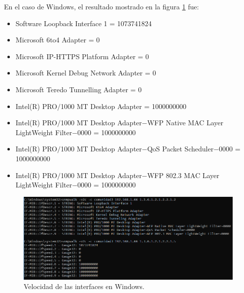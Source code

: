 En el caso de Windows, el resultado mostrado en la figura \ref{image:velocidadInterfacesw} fue:
\begin{itemize}
\item Software Loopback Interface 1 = 1073741824
\item Microsoft 6to4 Adapter = 0
\item Microsoft IP-HTTPS Platform Adapter = 0
\item Microsoft Kernel Debug Network Adapter = 0
\item Microsoft Teredo Tunnelling Adapter = 0
\item Intel(R) PRO$/$1000 MT Desktop Adapter = 1000000000
\item Intel(R) PRO$/$1000 MT Desktop Adapter$-$WFP Native MAC Layer LightWeight Filter$-$0000 = 1000000000
\item Intel(R) PRO$/$1000 MT Desktop Adapter$-$QoS Packet Scheduler$-$0000 = 1000000000
\item Intel(R) PRO$/$1000 MT Desktop Adapter$-$WFP 802.3 MAC Layer LightWeight Filter$-$0000 = 1000000000
\end{itemize}
\FloatBarrier
\begin{figure}[htbp!]
		\centering
			\includegraphics[width=.95 \textwidth]{images/windows3}
		\caption{Velocidad de las interfaces en Windows.}
		\label{image:velocidadInterfacesw}
\end{figure}
\FloatBarrier
